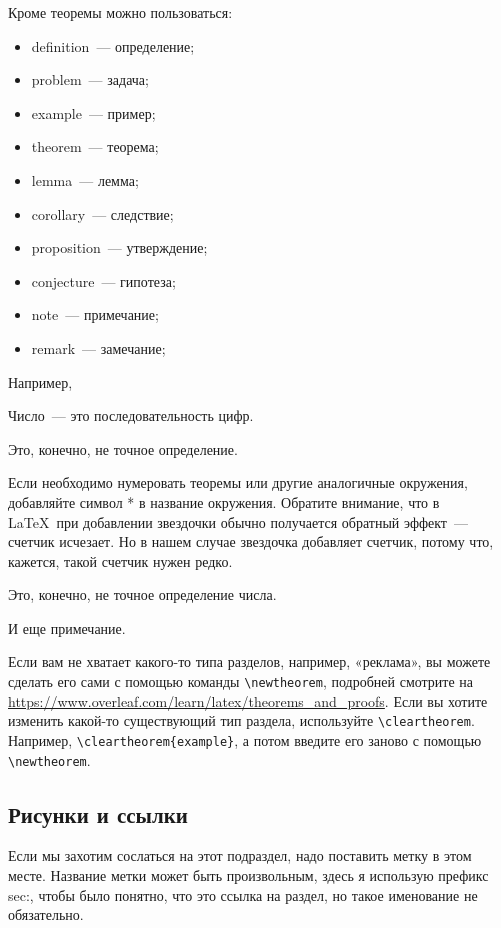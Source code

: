 \documentclass[russian]{lecture-notes}
\begin{document}
Кроме теоремы можно пользоваться:
\begin{itemize}
    \item definition~--- определение;
    \item problem~--- задача;
    \item example~--- пример;
    \item theorem~--- теорема;
    \item lemma~--- лемма;
    \item corollary~--- следствие;
    \item proposition~--- утверждение;
    \item conjecture~--- гипотеза;
    \item note~--- примечание;
    \item remark~--- замечание;
\end{itemize}

Например,

\begin{definition} Число~--- это последовательность цифр.
\end{definition}

\begin{remark}
Это, конечно, не точное определение.
\end{remark}

Если необходимо нумеровать теоремы или другие аналогичные окружения, добавляйте символ *
в название окружения. Обратите внимание, что в \LaTeX\ при добавлении звездочки обычно
получается обратный эффект~--- счетчик исчезает. Но в нашем случае звездочка добавляет
счетчик, потому что, кажется, такой счетчик нужен редко.

\begin{note*}
    Это, конечно, не точное определение числа.
\end{note*}
\begin{note*}
    И еще примечание.
\end{note*}

Если вам не хватает какого-то типа разделов, например, «реклама», вы можете сделать его
сами с помощью команды \verb|\newtheorem|, подробней смотрите на
\url{https://www.overleaf.com/learn/latex/theorems_and_proofs}.
Если вы хотите изменить какой-то существующий тип раздела, используйте \verb|\cleartheorem|. Например,
\verb|\cleartheorem{example}|, а потом введите его заново с помощью \verb|\newtheorem|.

\subsection{Рисунки и ссылки}
Если мы захотим сослаться на этот подраздел, надо поставить метку в этом месте.
Название метки может быть произвольным, здесь я использую префикс sec:, чтобы
было понятно, что это ссылка на раздел, но такое именование не обязательно.
\label{sec:images-and-refs}
\end{document}
